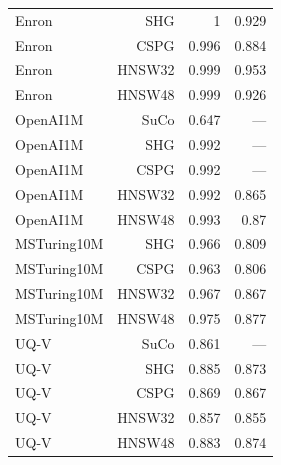 \begin{table}[t]
\begin{tabular}{lrrr}
Enron & SHG & 1 & 0.929 \\
Enron & CSPG & 0.996 & 0.884 \\
Enron & HNSW32 & 0.999 & 0.953 \\
Enron & HNSW48 & 0.999 & 0.926 \\
OpenAI1M & SuCo & 0.647 & — \\
OpenAI1M & SHG & 0.992 & — \\
OpenAI1M & CSPG & 0.992 & — \\
OpenAI1M & HNSW32 & 0.992 & 0.865 \\
OpenAI1M & HNSW48 & 0.993 & 0.87 \\
MSTuring10M & SHG & 0.966 & 0.809 \\
MSTuring10M & CSPG & 0.963 & 0.806 \\
MSTuring10M & HNSW32 & 0.967 & 0.867 \\
MSTuring10M & HNSW48 & 0.975 & 0.877 \\
UQ-V & SuCo & 0.861 & — \\
UQ-V & SHG & 0.885 & 0.873 \\
UQ-V & CSPG & 0.869 & 0.867 \\
UQ-V & HNSW32 & 0.857 & 0.855 \\
UQ-V & HNSW48 & 0.883 & 0.874 \\
\bottomrule
\end{tabular}
\end{table}
